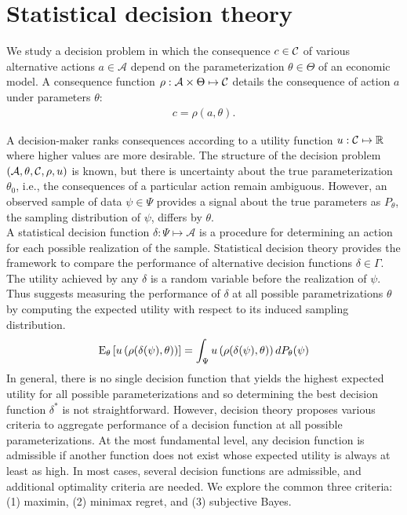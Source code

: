 \section*{Statistical decision theory}
We study a decision problem in which the consequence $c \in \mathcal{C}$ of various alternative actions $a\in\mathcal{A}$ depend on the parameterization $\theta\in \Theta$ of an economic model. A consequence function $\rho: \mathcal{A} \times \Theta \mapsto \mathcal{C}$  details the consequence of action $a$ under parameters $\theta$:
%
\begin{align*}
c = \rho(a, \theta).
\end{align*}

A decision-maker ranks consequences according to a utility function $u: \mathcal{C} \mapsto \mathbb{R}$ where higher values are more desirable. The structure of the decision problem $(\mathcal{A}, \theta, \mathcal{C}, \rho, u)$ is known, but there is uncertainty about the true parameterization $\theta_0$, i.e., the consequences of a particular action remain ambiguous. However, an observed sample of data $\psi \in \Psi$ provides a signal about the true parameters as $P_{\theta}$, the sampling distribution of $\psi$, differs by $\theta$.\\

A statistical decision function $\delta: \Psi \mapsto \mathcal{A}$ is a procedure for determining an action for each possible realization of the sample. Statistical decision theory provides the framework to compare the performance of alternative decision functions  $\delta \in \Gamma$. The utility achieved by any $\delta$ is a random variable before the realization of $\psi$. Thus \citet{Wald.1950} suggests measuring the performance of $\delta$ at all possible parametrizations $\theta$ by computing the expected utility with respect to its induced sampling distribution.
%
\begin{align*}
  \mathrm{E}_{\theta}\left[u\left(\rho(\delta(\psi), \theta)\right)\right] = \int_\Psi u\left(\rho(\delta(\psi), \theta)\right) d P_{\theta}(\psi)
\end{align*}
%
In general, there is no single decision function that yields the highest expected utility for all possible parameterizations and so determining the best decision function  $\delta^*$ is not straightforward. However, decision theory proposes various criteria \citep{Gilboa.2009,Marinacci.2015} to aggregate performance of a decision function at all possible parameterizations. At the most fundamental level, any decision function is admissible if another function does not exist whose expected utility is always at least as high. In most cases, several decision functions are admissible, and additional optimality criteria are needed. We explore the common three criteria: (1) maximin, (2) minimax regret, and (3) subjective Bayes.\\

